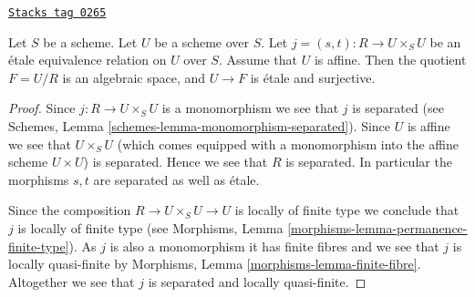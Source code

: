 \begin{lemma}
\label{spaces-lemma-presentation-quasi-compact}
\href{https://stacks.math.columbia.edu/tag/0265}{\texttt{Stacks tag 0265}}

Let $S$ be a scheme.
Let $U$ be a scheme over $S$.
Let $j = (s, t) : R \to U \times_S U$
be an \'etale equivalence relation on $U$ over $S$.
Assume that $U$ is affine. Then the quotient $F = U/R$
is an algebraic space, and $U \to F$ is \'etale and surjective.
\end{lemma}

\begin{proof}

Since $j : R \to U \times_S U$ is a monomorphism we see that $j$ is separated
(see Schemes, Lemma \ref{schemes-lemma-monomorphism-separated}).
Since $U$ is affine we see that $U \times_S U$
(which comes equipped with a monomorphism into the affine scheme
$U \times U$) is separated. Hence we see that $R$ is separated.
In particular the morphisms $s, t$ are separated as well as \'etale.

\medskip\noindent
Since the composition $R \to U \times_S U \to U$ is
locally of finite type we conclude that
$j$ is locally of finite type (see
Morphisms, Lemma \ref{morphisms-lemma-permanence-finite-type}).
As $j$ is also a monomorphism it has finite fibres and
we see that $j$ is locally quasi-finite by
Morphisms, Lemma \ref{morphisms-lemma-finite-fibre}.
Altogether we see that $j$ is separated and locally quasi-finite.


\end{proof}
